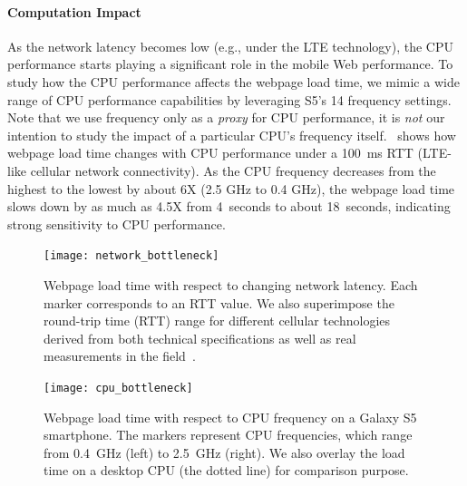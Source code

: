 \paragraph{Computation Impact} As the network latency becomes low (e.g., under the LTE technology), the CPU performance starts playing a significant role in the mobile Web performance. To study how the CPU performance affects the webpage load time, we mimic a wide range of CPU performance capabilities by leveraging S5's 14 frequency settings. Note that we use frequency only as a \textit{proxy} for CPU performance, it is \emph{not} our intention to study the impact of a particular CPU's frequency itself.~ shows how webpage load time changes with CPU performance under a 100~ms RTT (LTE-like cellular network connectivity). As the CPU frequency decreases from the highest to the lowest by about 6X (2.5 GHz to 0.4 GHz), the webpage load time slows down by as much as 4.5X from 4~seconds to about 18~seconds, indicating strong sensitivity to CPU performance.

\begin{figure}[t]
\centering
  \begin{minipage}[b]{0.47\columnwidth}
    \centering
    \texttt{[image: network\_bottleneck]}
    \caption{Webpage load time with respect to changing network latency. Each
marker corresponds to an RTT value. We also superimpose the round-trip time
(RTT) range for different cellular technologies derived from both technical
specifications as well as real measurements in the field~\cite{HPBN,
carrier_measure}.}
  \label{fig:network_bottleneck}
  \end{minipage}
  \hspace*{15pt}
  \begin{minipage}[b]{0.47\columnwidth}
    \centering
    \texttt{[image: cpu\_bottleneck]}
    \caption{Webpage load time with respect to CPU frequency on a Galaxy S5
smartphone. The markers represent CPU frequencies, which range from 0.4~GHz
(left) to 2.5~GHz (right). We also overlay the load time on a desktop CPU (the
dotted line) for comparison purpose.}
  \label{fig:cpu_bottleneck}
  \end{minipage}
\end{figure}

